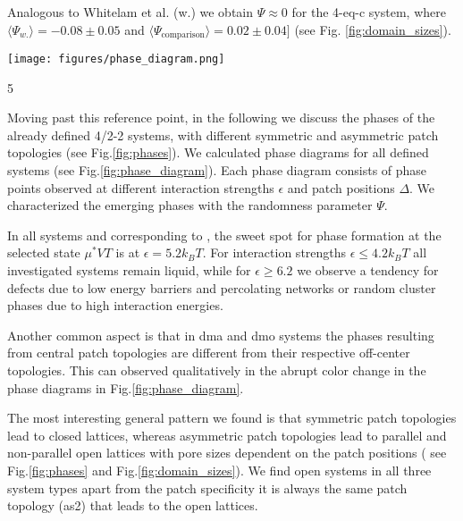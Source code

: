 \documentclass[a4paper,twocolumn]{revtex4}
\begin{document}
Analogous to Whitelam et al. (w.) we obtain $\Psi\approx 0$ for the 4-eq-c system, where $\langle\Psi_{w.}\rangle = -0.08 \pm 0.05$ and $\langle\Psi_{\text{comparison}}\rangle= 0.02\pm0.04]$ (see Fig. 
\ref{fig:domain_sizes}).


\begin{figure*}
\begin{center} 
\texttt{[image: figures/phase\_diagram.png]}
\caption{}5
\label{fig:phase_diagram}
\end{center} 
\end{figure*}


Moving past this reference point, in the following we discuss the phases of the already defined 4/2-2 systems, with different symmetric and asymmetric patch topologies (see Fig.\ref{fig:phases}).
We calculated phase diagrams for all defined systems (see Fig.\ref{fig:phase_diagram}).
Each phase diagram consists of phase points observed at different interaction strengths $\epsilon$ and patch positions $\Delta$.
We characterized the emerging phases with the randomness parameter $\Psi$. 

In all systems and corresponding to \cite{Whitlam}, the sweet spot for phase formation at the selected state $\mu^{*}VT$ is at $\epsilon = 5.2 k_{B}T$. For interaction strengths $\epsilon \leq  4.2 k_{B}T$ all investigated systems remain liquid, while for $\epsilon \geq 6.2$ we observe a tendency for defects due to low energy barriers and percolating networks or random cluster phases due to high interaction energies.

Another common aspect is that in dma and dmo systems the phases resulting from central patch topologies are different from their respective off-center topologies. This can observed qualitatively in the abrupt color change in the phase diagrams in Fig.\ref{fig:phase_diagram}.

The most interesting general pattern we found is that symmetric patch topologies lead to closed lattices, whereas asymmetric patch topologies lead to parallel and non-parallel open lattices with pore sizes dependent on the patch positions ( see Fig.\ref{fig:phases} and Fig.\ref{fig:domain_sizes}).
We find open systems in all three system types apart from the patch specificity it is always the same patch topology (as2) that leads 
to the open lattices. 
\end{document}
